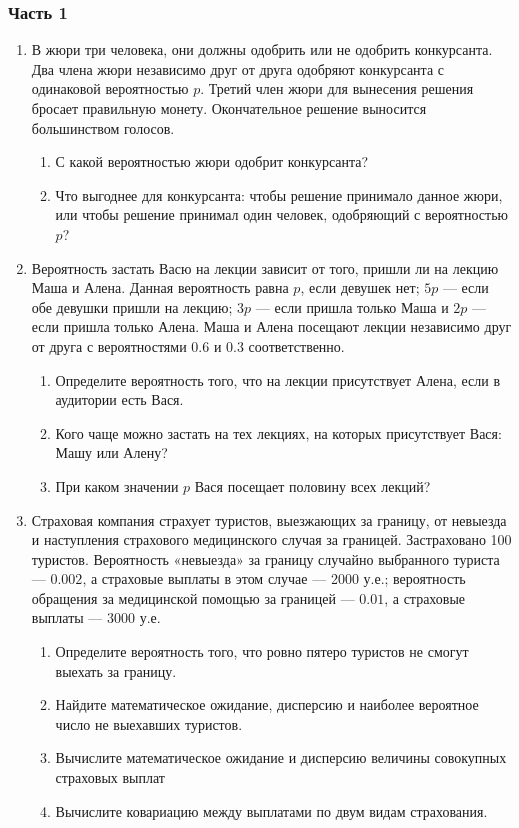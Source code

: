 \documentclass[12pt, a4paper]{article}\usepackage[]{graphicx}\usepackage[]{color}
\begin{document}
\subsubsection*{Часть 1}

\begin{enumerate}

\item В жюри три человека, они должны одобрить или не одобрить конкурсанта. Два члена жюри независимо друг от друга одобряют конкурсанта с одинаковой вероятностью $p$. Третий член жюри  для вынесения решения бросает правильную монету. Окончательное решение выносится большинством голосов.
\begin{enumerate}
\item С какой вероятностью жюри одобрит конкурсанта?
\item Что выгоднее для  конкурсанта: чтобы решение принимало данное жюри, или чтобы решение принимал один человек, одобряющий с вероятностью $p$?
\end{enumerate}


\item Вероятность застать Васю на лекции зависит от того, пришли ли на лекцию Маша и Алена. Данная вероятность равна $p$, если девушек нет; $5p$ — если обе девушки пришли на лекцию; $3p$ — если пришла только Маша и $2p$ — если пришла только Алена. Маша и Алена посещают лекции независимо друг от друга с вероятностями $0.6$ и $0.3$ соответственно.
\begin{enumerate}
\item Определите вероятность того, что на лекции присутствует Алена, если в аудитории есть Вася.
\item Кого чаще можно застать на тех лекциях, на которых присутствует Вася: Машу или Алену?
\item При каком значении $p$ Вася посещает половину всех лекций?
\end{enumerate}

\item Страховая компания страхует туристов, выезжающих за границу, от невыезда и наступления страхового медицинского случая за границей. Застраховано 100 туристов. Вероятность «невыезда» за границу случайно выбранного туриста — $0.002$, а страховые выплаты в этом случае — 2000 у.е.; вероятность обращения за медицинской помощью за границей — $0.01$, а страховые выплаты — 3000 у.е.
\begin{enumerate}
\item Определите вероятность того, что ровно пятеро туристов не смогут выехать за границу.
\item Найдите математическое ожидание, дисперсию и наиболее вероятное число не выехавших туристов.
\item Вычислите математическое ожидание и дисперсию величины совокупных страховых выплат
\item Вычислите ковариацию между выплатами по двум видам страхования.
\end{enumerate}


\end{enumerate}
\end{document}

